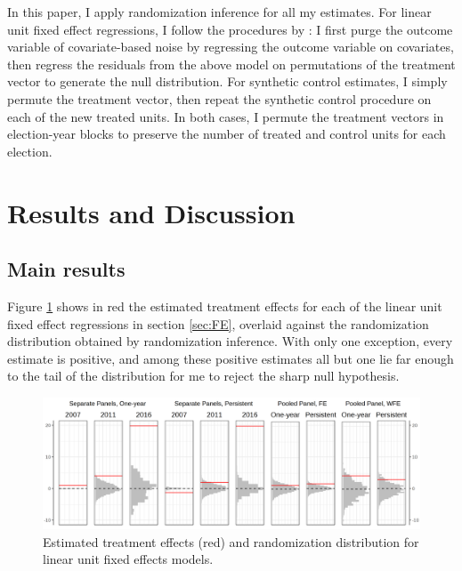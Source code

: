 \documentclass[12pt]{article}\usepackage[]{graphicx}\usepackage[]{color}
\newcommand{\1}{\mathbbm{1}}
\begin{document}

In this paper, I apply randomization inference for all my estimates. For linear unit fixed effect regressions, I follow the procedures by \cite{BowersPanagopoulous2011}: I first purge the outcome variable of covariate-based noise by regressing the outcome variable on covariates, then regress the residuals from the above model on permutations of the treatment vector to generate the null distribution. For synthetic control estimates, I simply permute the treatment vector, then repeat the synthetic control procedure on each of the new treated units. In both cases, I permute the treatment vectors in election-year blocks to preserve the number of treated and control units for each election. 

\section{Results and Discussion}
\label{sec:results}

\subsection{Main results}

Figure \ref{fig:FE} shows in red the estimated treatment effects for each of the linear unit fixed effect regressions in section \ref{sec:FE}, overlaid against the randomization distribution obtained by randomization inference. With only one exception, every estimate is positive, and among these positive estimates all but one  lie far enough to the tail of the distribution for me to reject the sharp null hypothesis. 

\begin{figure}[!htbp]
	\centering
	\includegraphics[width=\textwidth]{figure/SYP_FE.png}
	\captionsetup{singlelinecheck=off}
	\caption[Estimated treatment effects for linear unit fixed effects models]{Estimated treatment effects (red) and randomization distribution for linear unit fixed effects models.}
		\label{fig:FE}
	\end{figure}
\end{document}
